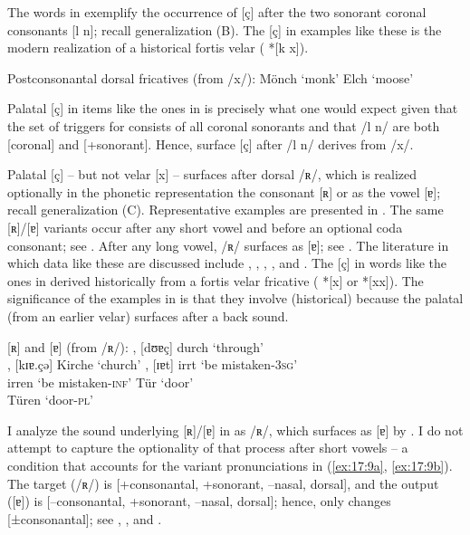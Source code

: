 The words in  exemplify the occurrence of [ç] after the two sonorant coronal consonants [l n]; recall generalization (B). The [ç] in examples like these is the modern realization of a historical fortis velar ( *[k x]).

\ea%
\label{ex:17:8}Postconsonantal dorsal fricatives (from /x/):
\ea\relax [mœnç] \tab Mönch \tab ‘monk’
\ex\relax [ɛlç]  \tab Elch  \tab ‘moose’
\z
\z 

Palatal [ç] in items like the ones in  is precisely what one would expect given that the set of triggers for  consists of all coronal sonorants and that /l n/ are both [coronal] and [+sonorant]. Hence, surface [ç] after /l n/ derives from /x/.

Palatal [ç] -- but not velar [x] -- surfaces after dorsal /ʀ/, which is realized optionally in the phonetic representation the consonant [ʀ] or as the vowel [ɐ]; recall generalization (C). Representative examples are presented in . The same [ʀ]/[ɐ] variants occur after any short vowel and before an optional coda consonant; see . After any long vowel, /ʀ/ surfaces as [ɐ]; see . The literature in which data like these are discussed include \citet[36]{Moulton1962}, \citet{Hall1993}, \citet[54]{Mangold2005}, \citet[253ff.]{Wiese1996a}, and \citet{Glover2014}. The [ç] in words like the ones in  derived historically from a fortis velar fricative ( *[x] or *[xx]). The significance of the examples in  is that they involve (historical)   because the palatal (from an earlier velar) surfaces after a back sound.


\ea%
\label{ex:17:9}[ʀ] and [ɐ] (from /ʀ/):
\ea\label{ex:17:9a} \relax [dʊʀç], [dʊɐç] \tab durch \tab ‘through’\\
    \relax [kɪʀ.çə], [kɪɐ.çə] \tab Kirche \tab ‘church’
\ex\label{ex:17:9b} \relax 
    \relax [ɪʀt], [ɪɐt] \tab irrt \tab ‘be mistaken\textsc{{}-3sg}’\\
    \relax [ɪ.ʀən] \tab irren \tab ‘be mistaken\textsc{{}-inf}’
\ex\label{ex:17:9c} \relax [tyːɐ] \tab Tür \tab ‘door’\\
     \tab Türen \tab ‘door-\textsc{pl}’
\z 
\z

I analyze the sound underlying [ʀ]/[ɐ] in  as /ʀ/, which surfaces as [ɐ] by . I do not attempt to capture the optionality of that process after short vowels -- a condition that accounts for the variant pronunciations in (\ref{ex:17:9a}, \ref{ex:17:9b}). The target (/ʀ/) is [+consonantal, +sonorant, --nasal, dorsal], and the output ([ɐ]) is [--consonantal, +sonorant, --nasal, dorsal]; hence,  only changes [±consonantal]; see \textcites[57]{Hall1992}[]{Hall1993}, \citet[256]{Wiese1996a}, and \citet{Glover2014}.

